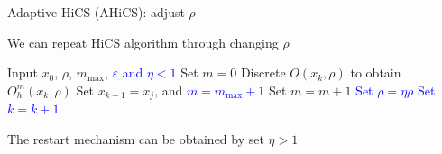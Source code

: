 \documentclass{beamer}
\begin{document}
\begin{frame}{Adaptive HiCS (AHiCS): adjust $\rho$}

\begin{itemize}
\footnotesize{
	\item We can repeat HiCS algorithm through changing $\rho$
		}
\vspace{-0.2cm}
\begin{algorithm}[H]
\scriptsize{
	\caption{AHiCS}
	\label{alg:refined}
\begin{algorithmic}[1]
	\STATE Input $x_0$, $\rho$, $m_{\max}$,
	\textcolor{blue}{$\varepsilon$ and $\eta<1$}
	\IF { \textcolor{blue}{ $\rho>\varepsilon$}}
		\STATE Set $m=0$
			\STATE Discrete $O(x_k,\rho)$ to obtain $O^m_h(x_k,\rho)$
			\STATE Set $x_{k+1}=x_j$, 
				and \textcolor{blue}{$m=m_{\max}+1$} 
			\ELSE
				\STATE Set $m = m+1$
			\ENDIF
		\ELSE
			\STATE \textcolor{blue}{ Set $\rho=\eta\rho$}
		\ENDIF
		\STATE \textcolor{blue}{Set $k=k+1$}
	\ENDFOR
\ENDIF
\end{algorithmic}
}
\end{algorithm}
\pause
\vspace{-0.3cm}
\footnotesize{
	\item The restart mechanism can be obtained by set $\eta>1$
		}
\end{itemize}
\end{frame}
\end{document}
